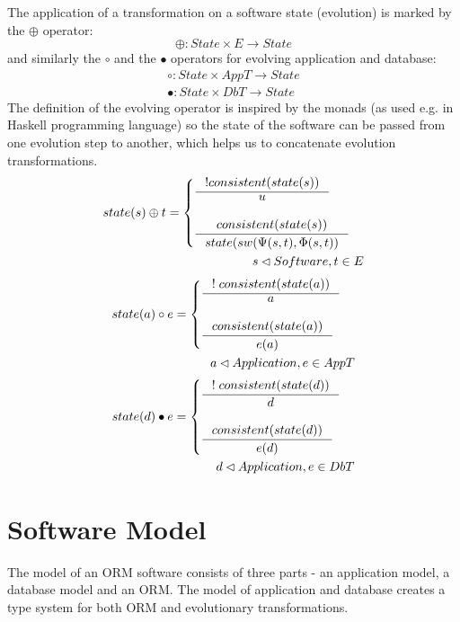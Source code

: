 \documentclass[11pt]{article}
\begin{document}
The application of a transformation on a software state (evolution) is marked by the $\oplus$ operator:
$$\oplus : State \times E \rightarrow State $$
and similarly the $\circ$ and the $\bullet$ operators for evolving application and database:
\begin{align*}
\circ : State \times AppT \rightarrow State \\
 \bullet : State \times DbT \rightarrow State
\end{align*}
The definition of the evolving operator is inspired by the monads (as used e.g. in Haskell programming language) so the state of the software can be passed from one evolution step to another, which helps us to concatenate evolution transformations.
\begin{align*}
 state(s) \oplus t = \begin{cases}
 	\inference{! consistent(state(s))}{u} \\ \\
 	\inference{consistent(state(s))}{state(sw(\Psi(s, t), \Phi(s,t))} 
\end{cases}\\ 
s \lhd Software, t \in E
\end{align*}
\begin{align*}
 state(a) \circ e = \begin{cases}
 	\inference{!\;consistent(state(a))}{a} \\ \\
 	\inference{consistent(state(a))}{e(a)} 
\end{cases}\\ 
a \lhd Application, e \in AppT
\end{align*}
\begin{align*}
 state(d) \bullet e = \begin{cases}
 	\inference{!\;consistent(state(d))}{d} \\ \\
 	\inference{consistent(state(d))}{e(d)} 
\end{cases}\\ 
d \lhd Application, e \in DbT
\end{align*}

\section{Software Model}
The model of an ORM software consists of three parts - an application model, a database model and an ORM. The model of application and database creates a type system for both ORM and evolutionary transformations.
\end{document}
